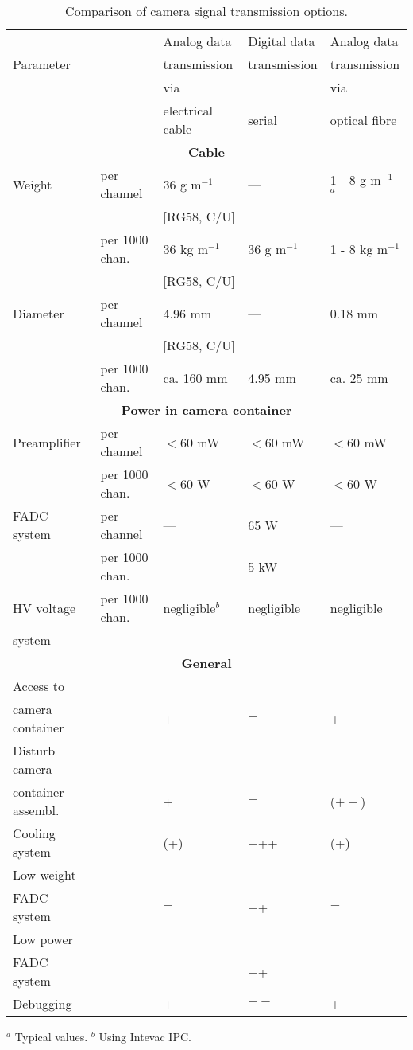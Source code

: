 \begin{table}[htb]
\begin{center}
\begin{tabular}{|l|l|l|l|l|}
\hline
&  & Analog data & Digital data & Analog data \\ 
Parameter &  & transmission  & transmission & transmission  \\ 
&  & via &  & via \\ 
&  & electrical cable & serial & optical fibre \\ \hline\hline
\multicolumn{5}{|c|}{{\bf Cable}} \\ \hline\hline
Weight & per channel & 36 g m$^{-1}$ & --- & 1 - 8 g m$^{-1}$ $^{a}$ \\ 
&  & [RG58, C/U] &  &  \\ \hline
& per 1000 chan. & 36 kg m$^{-1}$ & 36 g m$^{-1}$ & 1 - 8 kg m$^{-1}$ \\ 
&  & [RG58, C/U] &  &  \\ \hline
Diameter & per channel & 4.96 mm & --- & 0.18 mm \\ 
&  & [RG58, C/U] &  &  \\ \hline
& per 1000 chan. & ca. 160 mm & 4.95 mm & ca. 25 mm  \\ \hline\hline
\multicolumn{5}{|c|}{{\bf  Power in camera container}} \\ \hline\hline
Preamplifier & per channel & $<60$ mW & $<60$ mW & $<60$ mW \\ \hline
& per 1000 chan. & $<60$ W & $<60$ W & $<60$ W \\ \hline
FADC system & per channel & --- & 65 W & --- \\ \hline
& per 1000 chan. & --- & 5 kW & --- \\ \hline
HV voltage & per 1000 chan. & negligible$^{b}$ & negligible & negligible \\ 
system &  &  &  &  \\ \hline\hline
\multicolumn{5}{|c|}{{\bf General}} \\ \hline\hline
Access to &  &  &  &  \\ 
camera container &  & + & $-$ & + \\ \hline
Disturb camera &  &  &  &  \\ 
container assembl. &  & + & $-$ & ($+-$) \\ \hline
Cooling system &  & (+) & +++ & (+) \\ \hline
Low weight &  &  &  &  \\ 
FADC system &  & $-$ & ++ & $-$ \\ \hline
Low power &  &  &  &  \\ 
FADC system &  & $-$ & ++ & $-$ \\ \hline
Debugging &  & + & $--$ & + \\ \hline
\end{tabular}
\end{center}
\noindent
{\small $^a$ Typical values.\newline
$^{b}$ Using Intevac IPC.}

\caption{\label{tab-comptrans}
  Comparison of camera signal transmission options.
}
\end{table}

